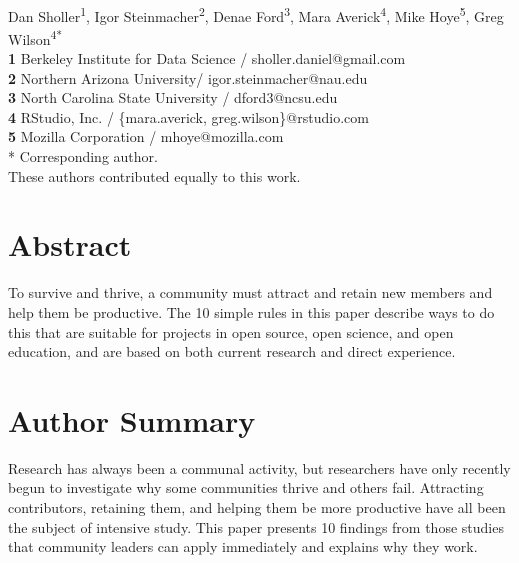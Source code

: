 \documentclass[10pt,letterpaper]{article}
\date{}
\begin{document}
\vspace*{0.2in}

\begin{flushleft}
{\Large
\textbf{}
}
\newline
\\
{Dan Sholler}\textsuperscript{1{\ddag}},
{Igor Steinmacher}\textsuperscript{2{\ddag}},
{Denae Ford}\textsuperscript{3{\ddag}},
{Mara Averick}\textsuperscript{4{\ddag}},
{Mike Hoye}\textsuperscript{5{\ddag}},
{Greg Wilson}\textsuperscript{4{\ddag}*}
\\
\bigskip
\textbf{1} Berkeley Institute for Data Science / sholler.daniel@gmail.com \\
\textbf{2} Northern Arizona University/ igor.steinmacher@nau.edu \\
\textbf{3} North Carolina State University / dford3@ncsu.edu \\
\textbf{4} RStudio, Inc. / \{mara.averick, greg.wilson\}@rstudio.com \\
\textbf{5} Mozilla Corporation / mhoye@mozilla.com \\
* Corresponding author. \\
\bigskip
{\ddag} These authors contributed equally to this work.
\end{flushleft}

\section*{Abstract}

To survive and thrive,
a community must attract and retain new members
and help them be productive.
The 10 simple rules in this paper describe ways to do this
that are suitable for projects in open source, open science, and open education,
and are based on both current research and direct experience.

\section*{Author Summary}

Research has always been a communal activity,
but researchers have only recently begun to investigate why some communities thrive and others fail.
Attracting contributors,
retaining them,
and helping them be more productive
have all been the subject of intensive study.
This paper presents 10 findings from those studies that community leaders can apply immediately
and explains why they work.
\end{document}
